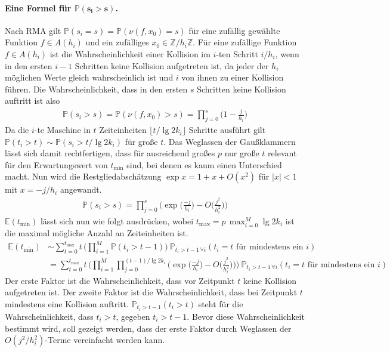 \documentclass[a4paper, 10pt, ngerman]{article}
\newcommand{\E}{\mathbb{E}}
\newcommand{\Z}{\mathbb{Z}}
\renewcommand{\P}{\mathbb{P}}
\begin{document}
\paragraph{Eine Formel für $\pmb{\P(s_i > s)}$.} Nach RMA gilt $\P(s_i = s) = \P(\nu(f, x_0) = s)$ für eine zufällig gewählte Funktion $f \in A(h_i)$ und ein zufälliges $x_0 \in \Z/h_i\Z$. Für eine zufällige Funktion $f \in A(h_i)$ ist die Wahrscheinlichkeit einer Kollision im $i$-ten Schritt $i/h_i$, wenn in den ersten $i-1$ Schritten keine Kollision aufgetreten ist, da jeder der $h_i$ möglichen Werte gleich wahrscheinlich ist und $i$ von ihnen zu einer Kollision führen. Die Wahrscheinlichkeit, dass in den ersten $s$ Schritten keine Kollision auftritt ist also
\begin{align*}
    \P(s_i > s) = \P(\nu(f, x_0) > s) = \prod_{j = 0}^s \bigg (1 - \frac {j} {h_i} \bigg )
\end{align*}
Da die $i$-te Maschine in $t$ Zeiteinheiten $\lfloor t / \lg 2k_i \rfloor$ Schritte ausführt gilt $\P(t_i > t) \sim \P(s_i > t / \lg 2k_i)$ für große $t$. Das Weglassen der Gaußklammern lässt sich damit rechtfertigen, dass für ausreichend großes $p$ nur große $t$ relevant für den Erwartungswert von $t_{\min}$ sind, bei denen es kaum einen Unterschied macht. Nun wird die Restgliedabschätzung $\exp x = 1 + x + O(x^2)$ für $|x| < 1$ mit $x = -j/h_i$ angewandt.
\begin{align*}
    \P(s_i > s) = \prod_{j = 0}^{s} \Bigg ( \exp \bigg ( \frac {-j}{h_i} \bigg ) - O \bigg ( \frac {j^2} {h_i^2} \bigg ) \Bigg )
\end{align*}
$\E(t_{\min})$ lässt sich nun wie folgt ausdrücken, wobei $t_{\max} = p \, \max_{i = 0}^M \lg 2k_i$ ist die maximal mögliche Anzahl an Zeiteinheiten ist.
\begin{align*}
    \E(t_{\min})
     & \sim \sum_{t = 0}^{t_{\max}} t \, \Bigg ( \prod_{i = 1}^M \P(t_i > t - 1) \Bigg ) \ \P_{t_i > t - 1 \, \forall i}(t_i = t \text{ für mindestens ein } i)                                                                                                           \\
     & = \sum_{t = 0}^{t_{\max}} t \, \Bigg ( \prod_{i = 1}^M \prod_{j = 0}^{(t-1) / \lg 2k_i} \Bigg ( \exp \bigg ( \frac {-j}{h_i} \bigg ) - O \bigg ( \frac {j^2} {h_i^2} \bigg ) \Bigg )\Bigg ) \ \P_{t_i > t - 1 \, \forall i}(t_i = t \text{ für mindestens ein } i)
\end{align*}
Der erste Faktor ist die Wahrscheinlichkeit, dass vor Zeitpunkt $t$ keine Kollision aufgetreten ist. Der zweite Faktor ist die Wahrscheinlichkeit, dass bei Zeitpunkt $t$ mindestens eine Kollision auftritt. $\P_{t_i > t - 1}(t_i > t)$ steht für die Wahrscheinlichkeit, dass $t_i > t$, gegeben $t_i > t - 1$. Bevor diese Wahrscheinlichkeit bestimmt wird, soll gezeigt werden, dass der erste Faktor durch Weglassen der $O(j^2/h_i^2)$-Terme vereinfacht werden kann.
\end{document}
